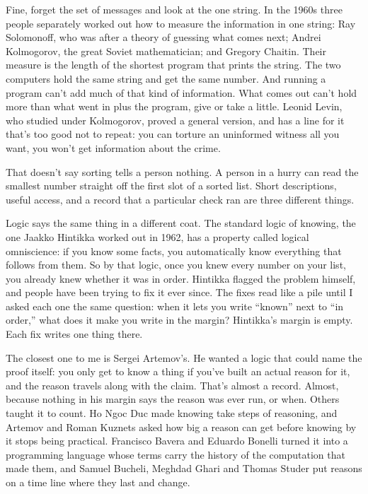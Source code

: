 \documentclass[11pt,twoside]{article}
\theoremstyle{thielethm}
\theoremstyle{thieledef}
\theoremstyle{thieledef}
\theoremstyle{thieledef}
\theoremstyle{thielethm}
\theoremstyle{thieleobs}
\theoremstyle{thielethm}
\begin{document}
Fine, forget the set of messages and look at the one string. In the 1960s three people separately worked out how to measure the information in one string: Ray Solomonoff, who was after a theory of guessing what comes next; Andrei Kolmogorov, the great Soviet mathematician; and Gregory Chaitin. Their measure is the length of the shortest program that prints the string. The two computers hold the same string and get the same number. And running a program can't add much of that kind of information. What comes out can't hold more than what went in plus the program, give or take a little. Leonid Levin, who studied under Kolmogorov, proved a general version, and has a line for it that's too good not to repeat: you can torture an uninformed witness all you want, you won't get information about the crime.

That doesn't say sorting tells a person nothing. A person in a hurry can read the smallest number straight off the first slot of a sorted list. Short descriptions, useful access, and a record that a particular check ran are three different things.

Logic says the same thing in a different coat. The standard logic of knowing, the one Jaakko Hintikka worked out in 1962, has a property called logical omniscience: if you know some facts, you automatically know everything that follows from them. So by that logic, once you knew every number on your list, you already knew whether it was in order. Hintikka flagged the problem himself, and people have been trying to fix it ever since. The fixes read like a pile until I asked each one the same question: when it lets you write ``known'' next to ``in order,'' what does it make you write in the margin? Hintikka's margin is empty. Each fix writes one thing there.

The closest one to me is Sergei Artemov's. He wanted a logic that could name the proof itself: you only get to know a thing if you've built an actual reason for it, and the reason travels along with the claim. That's almost a record. Almost, because nothing in his margin says the reason was ever run, or when. Others taught it to count. Ho Ngoc Duc made knowing take steps of reasoning, and Artemov and Roman Kuznets asked how big a reason can get before knowing by it stops being practical. Francisco Bavera and Eduardo Bonelli turned it into a programming language whose terms carry the history of the computation that made them, and Samuel Bucheli, Meghdad Ghari and Thomas Studer put reasons on a time line where they last and change.
\end{document}
